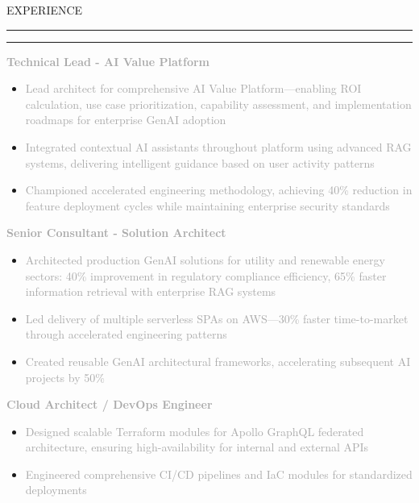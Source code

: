 \documentclass[10pt,letterpaper]{article}
\newcommand{\mainheader}[1]{%
    \vspace{8pt}
    {\displayfont\Large\textcolor{accent}{\MakeUppercase{#1}}}
    \vspace{2pt}
    \par\noindent\textcolor{accent}{\rule{4.7in}{2pt}}
    \vspace{5pt}
}
\newcommand{\companyHeader}[2]{%
    \vspace{5pt}
    \noindent\textcolor{#2}{\rule{3pt}{10pt}}\hspace{6pt}{\headingfont\normalsize\textbf{\textcolor{darkgray}{#1}}}
    \vspace{2pt}
}
\newcommand{\positionHeader}[2]{%
    \noindent\textbf{\textcolor{darkgray}{#2}}\hspace{4pt}{\footnotesize\textcolor{mediumgray}{//}}\hspace{4pt}{\footnotesize\itshape\textcolor{mediumgray}{#1}}
    \vspace{1pt}
}
\begin{document}
\begin{minipage}[t][10.5in][t]{5.3in}
\vspace{0.4in}
\hspace{0.3in}
\begin{minipage}{4.7in}
\raggedright

\mainheader{Experience}

\companyHeader{Slalom}{company1}

\positionHeader{2023–Present}{Technical Lead - AI Value Platform}
\begin{itemize}
    \setlength\itemsep{1pt}
    \item\small\textcolor{darkgray}{Lead architect for comprehensive AI Value Platform—enabling ROI calculation, use case prioritization, capability assessment, and implementation roadmaps for enterprise GenAI adoption}
    \item\small\textcolor{darkgray}{Integrated contextual AI assistants throughout platform using advanced RAG systems, delivering intelligent guidance based on user activity patterns}
    \item\small\textcolor{darkgray}{Championed accelerated engineering methodology, achieving 40\% reduction in feature deployment cycles while maintaining enterprise security standards}
\end{itemize}

\vspace{2pt}

\positionHeader{2022–2023}{Senior Consultant - Solution Architect}
\begin{itemize}
    \setlength\itemsep{1pt}
    \item\small\textcolor{darkgray}{Architected production GenAI solutions for utility and renewable energy sectors: 40\% improvement in regulatory compliance efficiency, 65\% faster information retrieval with enterprise RAG systems}
    \item\small\textcolor{darkgray}{Led delivery of multiple serverless SPAs on AWS—30\% faster time-to-market through accelerated engineering patterns}
    \item\small\textcolor{darkgray}{Created reusable GenAI architectural frameworks, accelerating subsequent AI projects by 50\%}
\end{itemize}

\vspace{2pt}

\positionHeader{2022}{Cloud Architect / DevOps Engineer}
\begin{itemize}
    \setlength\itemsep{1pt}
    \item\small\textcolor{darkgray}{Designed scalable Terraform modules for Apollo GraphQL federated architecture, ensuring high-availability for internal and external APIs}
    \item\small\textcolor{darkgray}{Engineered comprehensive CI/CD pipelines and IaC modules for standardized deployments}
\end{itemize}


\end{minipage}
\end{minipage}
\end{document}
